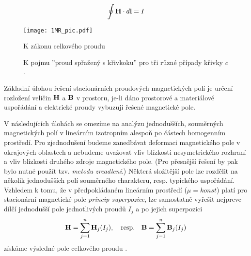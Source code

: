       \begin{equation}\label{TEMP:eq_zak_celk_I}
        \oint\mathbf{H}\cdot d\mathbf{l} = I   
      \end{equation}    
     
      \begin{figure}[ht!]
         \centering
         \texttt{[image: 1MR\_pic.pdf]}
         \caption[Zákon celkového proudu]{K zákonu celkového proudu}
         \label{TEMP:fig_1MR_pic}
      \end{figure}

         \begin{figure}[hb!]
           \centering
           \caption[K pojmu ''proud spřažený s křivkoku'']{K pojmu ''proud spřažený s křivkoku''
                    pro tři různé případy křivky $c$.}
           \label{TEMP:fig_mag_sprazeny_proud123}
         \end{figure}
         
    Základní úlohou řešení stacionárních proudových magnetických polí je určení rozložení veličin $\mathbf{H}$ a 
    $\mathbf{B}$ v prostoru, je-li dáno prostorové a materiálové uspořádání a elektrické proudy vybuzují řešené 
    magnetické pole.
    
    V následujících úlohách se omezíme na analýzu jednodušších, souměrných magnetických polí v lineárním 
    izotropním alespoň po částech homogenním prostředí. Pro zjednodušení budeme zanedbávat deformaci 
    magnetického pole v okrajových oblastech a nebudeme uvažovat vliv blízkosti nesymetrického rozhraní a 
    vliv blízkosti druhého zdroje magnetického pole. (Pro přesnější řešení by pak bylo nutné použít tzv. 
    \emph{metodu zrcadlení}.) Některá složitější pole lze rozdělit na několik jednodušších polí souměrného 
    charakteru, resp. typického uspořádání. Vzhledem k tomu, že v předpokládaném lineárním prostředí ($\mu = 
    konst$) platí pro stacionární magnetické pole \emph{princip superpozice}, lze samostatně vyřešit nejpreve 
    dílčí jednodušší pole jednotlivých proudů $I_j$ a po jejich superpozici
      \begin{equation}\label{TEMP:eq_superp_mag_pole}
        \mathbf{H}= \sum_{j=1}^n\mathbf{H}_j(I_j), \quad\text{resp.}\quad \mathbf{B}= \sum_{j=1}^n\mathbf{B}_j(I_j)   
      \end{equation}
    získáme výsledné pole celkového proudu \cite[s.~181]{Kotlan1999}. 
    
